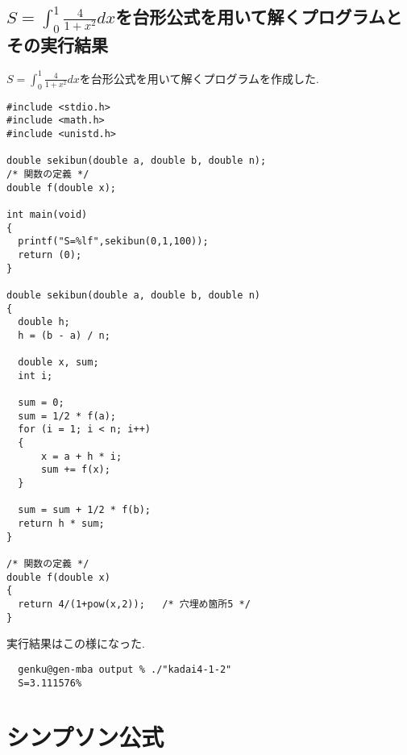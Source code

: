 \documentclass[a4j,10pt,dvipdfmx]{jarticle}
\begin{document}
\subsection{$S=\int_{0}^{1}\frac{4}{1+x^2}dx$を台形公式を用いて解くプログラムとその実行結果}
$S=\int_{0}^{1}\frac{4}{1+x^2}dx$を台形公式を用いて解くプログラムを作成した.
\begin{lstlisting}[label=prm2, caption=kadai4-1-2.c]
#include <stdio.h>
#include <math.h>
#include <unistd.h>

double sekibun(double a, double b, double n);
/* 関数の定義 */
double f(double x);

int main(void)
{
  printf("S=%lf",sekibun(0,1,100));
  return (0);
}

double sekibun(double a, double b, double n)
{
  double h;
  h = (b - a) / n;

  double x, sum;
  int i;

  sum = 0;
  sum = 1/2 * f(a);
  for (i = 1; i < n; i++)
  {
      x = a + h * i;
      sum += f(x);
  }

  sum = sum + 1/2 * f(b);
  return h * sum;
}

/* 関数の定義 */
double f(double x)
{
  return 4/(1+pow(x,2));   /* 穴埋め箇所5 */
}

\end{lstlisting}
実行結果はこの様になった.
\begin{verbatim}
  genku@gen-mba output % ./"kadai4-1-2"
  S=3.111576%       
\end{verbatim}
\section{シンプソン公式}
\end{document}
